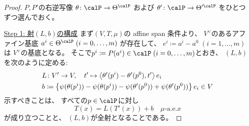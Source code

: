\documentclass[report]{jlreq}
\begin{document}
\begin{proof}
    $P, P'$の右逆写像
    $\theta \colon \calP \to \Theta^\calP$
    および
    $\theta' \colon \calP \to \Theta'^\calP$
    をひとつずつ選んでおく。

    \uline{Step 1: 射$(L, b)$の構成} \quad
    まず$(V, T, \mu)$の affine span 条件より、
    $V^\vee$のあるアファイン基底
    $a^i \in \Theta^\calP \; (i = 0, \dots, m)$
    が存在して、
    $e^i \coloneqq a^i - a^0 \; (i = 1, \dots, m)$は
    $V^\vee$の基底となる。
    そこで$p^i \coloneqq P(a^i) \in \calP \; (i = 0, \dots, m)$とおき、
    $(L, b)$を次のように定める:
    \begin{alignat}{1}
        &L \colon V' \to V,
            \quad
            t' \mapsto
                \left\langle{\theta'(p^i) - \theta'(p^0)},{t'}\right\rangle e_i
            \\
        &b \coloneqq
            \left\{{
                \psi(\theta(p^i)) - \psi(\theta(p^i))
                - \psi(\theta'(p^0)) + \psi(\theta'(p^0))
            }\right\} e_i
            \in V
    \end{alignat}
    示すべきことは、
    すべての$p \in \calP$に対し
    \begin{equation}
        T(x) = L(T'(x)) + b
            \quad
            \text{$\mu$-a.e.$x$}
    \end{equation}
    が成り立つことと、
    $(L, b)$が全射となることである。


\end{proof}
\end{document}
